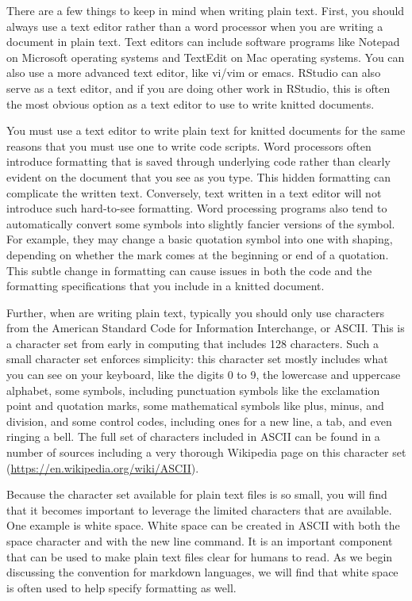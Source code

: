 \documentclass[]{tufte-book}
\begin{document}
There are a few things to keep in mind when writing plain text. First, you
should always use a text editor rather than a word processor when you are
writing a document in plain text. Text editors can include software programs
like Notepad on Microsoft operating systems and TextEdit on Mac operating
systems. You can also use a more advanced text editor, like vi/vim or emacs.
RStudio can also serve as a text editor, and if you are doing other work in
RStudio, this is often the most obvious option as a text editor to use to write
knitted documents.

You must use a text editor to write plain text for knitted documents for the
same reasons that you must use one to write code scripts. Word processors often
introduce formatting that is saved through underlying code rather than clearly
evident on the document that you see as you type. This hidden formatting can
complicate the written text. Conversely, text written in a text editor will not
introduce such hard-to-see formatting. Word processing programs also tend to
automatically convert some symbols into slightly fancier versions of the symbol.
For example, they may change a basic quotation symbol into one with shaping,
depending on whether the mark comes at the beginning or end of a quotation. This
subtle change in formatting can cause issues in both the code and the formatting
specifications that you include in a knitted document.

Further, when are writing plain text, typically you should only use characters
from the American Standard Code for Information Interchange, or ASCII. This is a
character set from early in computing that includes 128 characters. Such a small
character set enforces simplicity: this character set mostly includes what you
can see on your keyboard, like the digits 0 to 9, the lowercase and uppercase
alphabet, some symbols, including punctuation symbols like the exclamation point
and quotation marks, some mathematical symbols like plus, minus, and division,
and some control codes, including ones for a new line, a tab, and even ringing a
bell. The full set of characters included in ASCII can be found in a number of
sources including a very thorough Wikipedia page on this character set (\url{https://en.wikipedia.org/wiki/ASCII}).

Because the character set available for plain text files is so small, you will
find that it becomes important to leverage the limited characters that are
available. One example is white space. White space can be created in ASCII
with both the space character and with the new line command. It is an important
component that can be used to make plain text files clear for humans to read. As
we begin discussing the convention for markdown languages, we will find that
white space is often used to help specify formatting as well.
\end{document}
